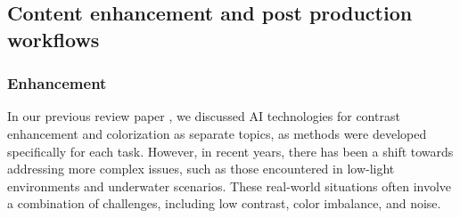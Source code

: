 \documentclass[11pt,a4paper]{article}
\begin{document}
\subsection{Content enhancement and post production workflows}

\subsubsection{Enhancement}

In our previous review paper \cite{Anantrasirichai:AI:2022}, we discussed AI technologies for contrast enhancement and colorization as separate topics, as methods were developed specifically for each task. However, in recent years, there has been a shift towards addressing more complex issues, such as those encountered in low-light environments and underwater scenarios. These real-world situations often involve a combination of challenges, including low contrast, color imbalance, and noise.
\end{document}
